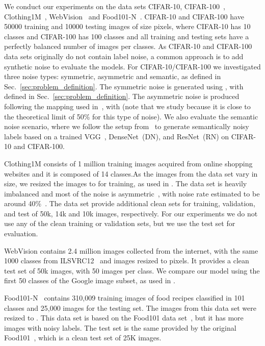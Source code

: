 \documentclass{article}
\begin{document}
We conduct our experiments on the data sets  CIFAR-10, CIFAR-100~\cite{krizhevsky2009learning}, Clothing1M~\cite{xiao2015learning}, WebVision~\cite{li2017WebVision} and Food101-N~\cite{lee2018cleannet}. CIFAR-10 and CIFAR-100 have 50000 training and 10000 testing images of size  pixels, where CIFAR-10 has 10 classes and CIFAR-100 has 100 classes and all training and testing sets have a perfectly balanced number of images per classes. As CIFAR-10 and CIFAR-100 data sets originally do not contain label noise, a common approach is to add synthetic noise to evaluate the models. For CIFAR-10/CIFAR-100 we investigated three  noise types: symmetric, asymmetric and semantic, as defined in Sec.~\ref{sec:problem_definition}. 
The symmetric noise is generated using , with   defined in Sec.~\ref{sec:problem_definition}.
The asymmetric noise is produced following the mapping used in~\cite{li2020dividemix, patrini2017making}, with  (note that we study  because it is close to the theoretical limit of 50\% for this type of noise).  We also evaluate the semantic noise scenario, where 
we follow the setup from~\cite{rog} to generate semantically noisy labels based on a trained VGG~\cite{vgg}, DenseNet~(DN), and ResNet~(RN) on CIFAR-10 and CIFAR-100.

Clothing1M consists of 1 million training images acquired from online shopping websites and it is composed of 14 classes.As the images from the data set vary in size, we resized the images to  for training, as used in \cite{li2020dividemix, han2019deep}.
The data set is heavily imbalanced and most of the noise is asymmetric~\cite{yi2019probabilistic}, with noise rate estimated to be around 40\%~\cite{xiao2015learning}. The data set provide additional clean sets for 
training, validation, and test of 50k, 14k and 10k images, respectively. For our experiments we do not use any of the clean training or validation sets, but we use the test set for evaluation.

WebVision contains 2.4 million images collected from the internet, with the same 1000 classes from ILSVRC12~\cite{deng2009imagenet} and images resized  to  pixels. It provides a clean test set of 50k images, with 50 images per class. We compare our model using the first 50 classes of the Google image subset, as used in \cite{li2020dividemix, chen2019understanding}.


Food101-N~\cite{lee2018cleannet} contains 310,009 training images of food recipes classified in 101 classes and 25,000 images for the testing set. The images from this data set were resized to . 
This data set is based on the Food101 data set~\cite{bossard2014food}, but it has more images with noisy labels. 
The test set is the same provided by the original Food101~\cite{bossard2014food}, which is a clean test set of 25K images.
\end{document}
